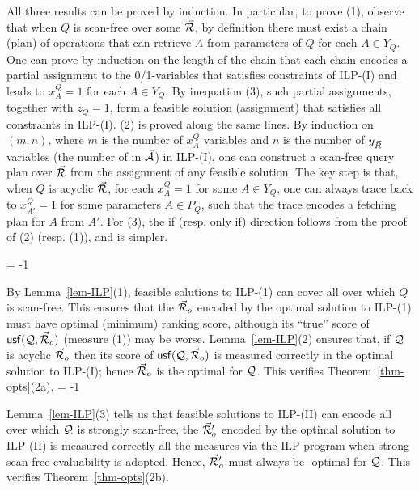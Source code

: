 {\begin{proofS}
All three results can be proved by induction. 
In particular, to prove (1), observe that when $Q$ is scan-free
over some \bds $\vec{{\mathcal R}}$, by definition there must exist a chain
(\ie plan)
of \get operations that can retrieve $A$ from parameters of $Q$
for each $A\in Y_{Q}$. One can prove by induction on the length
of the chain that each chain encodes a partial assignment to the
0/1-variables that satisfies constraints of ILP-(I) and leads to
$x_{A}^{Q} = 1$ for each $A\in Y_{Q}$. By inequation (3), such
partial assignments, together with $z_{Q} = 1$, form a feasible
solution (\ie assignment) that satisfies all constraints in ILP-(I).
%
(2) is proved along the same lines. By induction on $(m, n)$,
where $m$ is the number of $x_{A}^{Q}$ variables and $n$ is the
number of $y_{\vec{R}}$ variables (\ie the number of \bss in
$\vec{{\mathcal A}}$) in ILP-(I), one can construct a scan-free query plan
over $\vec{{\mathcal R}}$ from the assignment of any feasible solution. The
key step is that, when $Q$ is acyclic \wrt $\vec{{\mathcal R}}$, for each
$x_{A}^{Q} = 1$ for some $A\in Y_{Q}$, one can always trace back
to $x_{A'}^{Q} = 1$ for some parameters $A\in P_{Q}$, such that
the trace encodes a fetching plan for $A$ from $A'$.
For (3), the if (resp. only if) direction follows from the proof
of (2) (resp. (1)), and is simpler. 
\end{proofS}
\looseness = -1

By Lemma~\ref{lem-ILP}(1), feasible solutions to ILP-(1) can
cover all \bdss over which $Q$ is scan-free. This ensures that
the \bds $\vec{{\mathcal R}}_{o}$ encoded by the optimal solution to ILP-(1)
must have optimal (minimum) ranking score, although its ``true''
score of ${\mathsf{usf}}(\mathcal Q,\allowbreak \vec{{\mathcal R}}_{o})$ (\ie measure (1)) may be
worse. Lemma~\ref{lem-ILP}(2) ensures that, if $\mathcal Q$ is
acyclic \wrt $\vec{{\mathcal R}}_{o}$ then its score of ${\mathsf{usf}}(\mathcal Q,\allowbreak
\vec{{\mathcal R}}_{o})$ is measured correctly in the optimal solution to
ILP-(I); hence $\vec{{\mathcal R}}_{o}$ is the optimal \bds for $\mathcal Q$. This
verifies Theorem~\ref{thm-opts}(2a).
\looseness = -1

Lemma~\ref{lem-ILP}(3) tells us that feasible solutions to
ILP-(II) can encode all \bdss over which $\mathcal Q$ is strongly
scan-free, \ie the \bds $\vec{{\mathcal R}}_{o}'$ encoded by the optimal
solution to ILP-(II) is measured correctly \wrt all the measures
via the ILP program when strong scan-free evaluability is
adopted. Hence, $\vec{{\mathcal R}}_{o}'$ must always be \ssf-optimal for
$\mathcal Q$. This verifies Theorem~\ref{thm-opts}(2b). 

}
